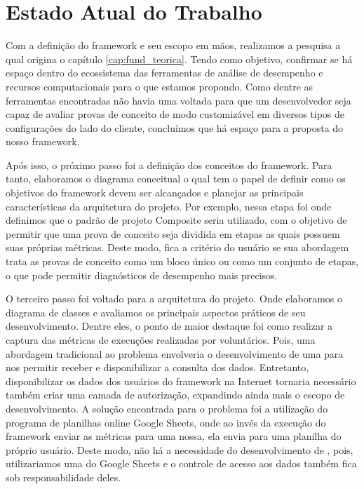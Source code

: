 \documentclass[12pt]{tcc}
\begin{document}
\chapter{Estado Atual do Trabalho}
\label{cap:estado_atual}

Com a definição do framework e seu escopo em mãos, realizamos a pesquisa a qual origina o capítulo \ref{cap:fund_teorica}.
Tendo como objetivo, confirmar se há espaço dentro do ecossistema das ferramentas de análise de desempenho e recursos computacionais para o que estamos propondo.
Como dentre as ferramentas encontradas não havia uma voltada para que um desenvolvedor seja capaz de avaliar provas de conceito de modo customizável em diversos tipos de configurações do lado do cliente, concluímos que há espaço para a proposta do nosso framework.

Após isso, o próximo passo foi a definição dos conceitos do framework.
Para tanto, elaboramos o diagrama conceitual o qual tem o papel de definir como os objetivos do framework devem ser alcançados e planejar as principais características da arquitetura do projeto.
Por exemplo, nessa etapa foi onde definimos que o padrão de projeto Composite seria utilizado, com o objetivo de permitir que uma prova de conceito seja dividida em etapas as quais possuem suas próprias métricas.
Deste modo, fica a critério do usuário se sua abordagem trata as provas de conceito como um bloco único ou como um conjunto de etapas, o que pode permitir diagnósticos de desempenho mais precisos.

O terceiro passo foi voltado para a arquitetura do projeto.
Onde elaboramos o diagrama de classes e avaliamos os principais aspectos práticos de seu desenvolvimento.
Dentre eles, o ponto de maior destaque foi como realizar a captura das métricas de execuções realizadas por voluntários.
Pois, uma abordagem tradicional ao problema envolveria o desenvolvimento de uma  para nos permitir receber e disponibilizar a consulta dos dados.
Entretanto, disponibilizar os dados dos usuários do framework na Internet tornaria necessário também criar uma camada de autorização, expandindo ainda mais o escopo de desenvolvimento.
A solução encontrada para o problema foi a utilização do programa de planilhas online Google Sheets, onde ao invés da execução do framework enviar as métricas para uma  nossa, ela envia para uma planilha do próprio usuário.
Deste modo, não há a necessidade do desenvolvimento de , pois, utilizariamos uma do Google Sheets e o controle de acesso aos dados também fica sob responsabilidade deles.
\end{document}
